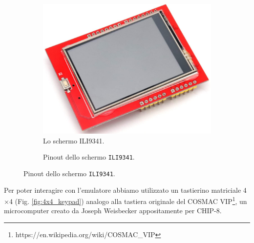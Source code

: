 \documentclass[a4paper]{article}
\begin{document}
\begin{figure}[h!t]
    \begin{subfigure}[b]{0.45\textwidth}
        \begin{center}
            \includegraphics[scale=0.30]{figures/ili9341.png}
        \end{center}
        \caption{Lo schermo ILI9341.}
        \label{fig:ili9341}
    \end{subfigure}
    \hfill
    \begin{subfigure}[b]{0.45\textwidth}
        \begin{center}
            \begin{tikzpicture}[x=0.015cm, y=0.015cm, scale=0.65, transform shape]
                
            \end{tikzpicture}
        \end{center}
        \caption{Pinout dello schermo \texttt{ILI9341}.}
        \label{fig:pinout_ili}
    \end{subfigure}
\end{figure}

Per poter interagire con l'emulatore abbiamo utilizzato un tastierino matriciale 4$\times$4
(Fig. \ref{fig:4x4_keypad}) analogo alla tastiera originale del
COSMAC VIP\footnote{https://en.wikipedia.org/wiki/COSMAC\_VIP}, un microcomputer
creato da Joseph Weisbecker appositamente per CHIP-8.
\end{document}
